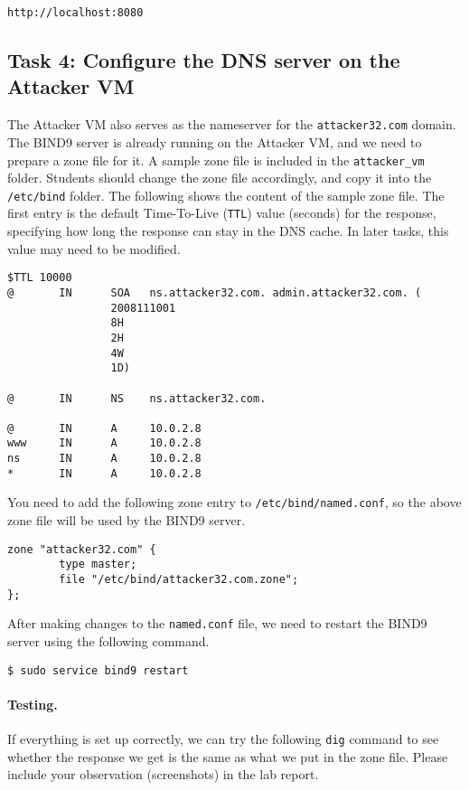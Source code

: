 \begin{lstlisting}
http://localhost:8080
\end{lstlisting}


\subsection{Task 4: Configure the DNS server on the Attacker VM}

The Attacker VM also serves as the nameserver for the \texttt{attacker32.com}
domain. The BIND9 server is already running on the Attacker VM, and 
we need to prepare a zone file for it. A sample 
zone file is included in the \texttt{attacker\_vm} folder.  Students should 
change the zone file accordingly, and copy it into the \texttt{/etc/bind} 
folder. The following shows the content of the sample zone file. The first 
entry is the default Time-To-Live (\texttt{TTL}) value (seconds) 
for the response, specifying how long the response can stay in
the DNS cache. In later tasks, this value may
need to be modified. 

\begin{lstlisting}
$TTL 10000
@       IN      SOA   ns.attacker32.com. admin.attacker32.com. (
                2008111001
                8H
                2H
                4W
                1D)

@       IN      NS    ns.attacker32.com.

@       IN      A     10.0.2.8
www     IN      A     10.0.2.8
ns      IN      A     10.0.2.8
*       IN      A     10.0.2.8
\end{lstlisting}
 

You need to add the following zone entry to \texttt{/etc/bind/named.conf},
so the above zone file will be used by the BIND9 server. 

\begin{lstlisting}
zone "attacker32.com" {
        type master;
        file "/etc/bind/attacker32.com.zone";
};
\end{lstlisting}
 

After making changes to the \texttt{named.conf} file, we need to 
restart the BIND9 server using the following command. 

\begin{lstlisting}
$ sudo service bind9 restart
\end{lstlisting}
 

\paragraph{Testing.} If everything is set up correctly, we can
try the following \texttt{dig} command to see whether the response we get 
is the same as what we put in the zone file. Please include your 
observation (screenshots) in the lab report. 

